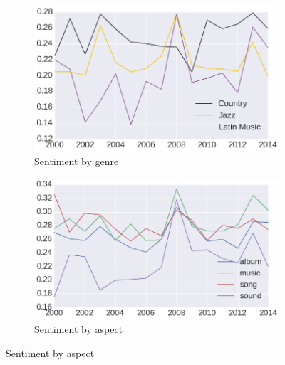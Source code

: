 \begin{figure}[ht!]
    \begin{subfigure}{.49\textwidth}
        \centering
        \includegraphics[width=\linewidth]{ch05_musicology_pics/genres_average.png}
        \caption{Sentiment by genre}
        \label{fig:musicology:avgSentReviewGenres}
    \end{subfigure}
    \begin{subfigure}{.50\textwidth}
        \centering
        \includegraphics[width=\linewidth]{ch05_musicology_pics/main_aspects.png}
        \caption{Sentiment by aspect}
        \label{fig:musicology:avgSentReviewAspects}
    \end{subfigure}
    

\end{figure}
